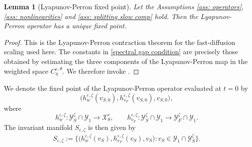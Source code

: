 \documentclass[11pt]{article}
\newtheorem{lemma}[theorem]{Lemma}
\theoremstyle{definition}
\theoremstyle{remark}
\numberwithin{equation}{section}
\newcommand{\mc}[1]{\mathcal{#1}}
\begin{document}
\begin{lemma}[Lyapunov-Perron fixed point]\label{lemma: lyapunov perron}
  Let the Assumptions \ref{ass: operators}, \ref{ass: nonlinearities} and \ref{ass: splitting slow comp} hold.
  Then the Lyapunov-Perron operator has a unique fixed point.
\end{lemma} 

\begin{proof}
This is the Lyapunov-Perron contraction theorem for the fast-diffusion scaling used here. 
The constants in \eqref{spectral gap condition} are precisely those obtained by estimating the three components of the Lyapunov-Perron map in the weighted space \(C_\eta^{\varepsilon,\theta}\).
We therefore invoke \cite[Lemma 3.3]{kuehn2026approximate}.
\end{proof}

We denote the fixed point of the Lyapunov-Perron operator evaluated at $t=0$ by 
\[
\bigl(h_w^{\varepsilon,\zeta}(v_{S,0}),
h_{v_F}^{\varepsilon,\zeta}(v_{S,0}),
v_{S,0}\bigr),
\]
where
\[
h_w^{\varepsilon,\zeta}:\mc Y_S^\zeta\cap \mc Y_1
\to \mc X_{\theta}^\varepsilon,
\qquad
h_{v_F}^{\varepsilon,\zeta}:\mc Y_S^\zeta\cap \mc Y_1
\to\mc  Y_F^\zeta\cap \mc Y_1.
\]
The invariant manifold $S_{\varepsilon,\zeta}$ is then given by
\begin{align}
    S_{\varepsilon,\zeta}:=\{ \big(h^{\varepsilon,\zeta}_{w}(v_S),h^{\varepsilon,\zeta}_{v_F}(v_S),v_S\big):v_S\in \mc Y_1\cap \mc Y_S^\zeta\}.
   \end{align}
\end{document}

